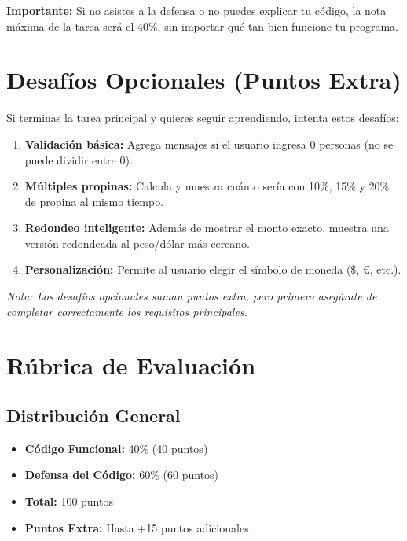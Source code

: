 \documentclass[12pt,a4paper]{article}
\begin{document}
\textbf{Importante:} Si no asistes a la defensa o no puedes explicar tu código, la nota máxima de la tarea será el 40\%, sin importar qué tan bien funcione tu programa.

\section{Desafíos Opcionales (Puntos Extra)}

Si terminas la tarea principal y quieres seguir aprendiendo, intenta estos desafíos:

\begin{enumerate}[leftmargin=*]
    \item \textbf{Validación básica:} Agrega mensajes si el usuario ingresa 0 personas (no se puede dividir entre 0).
    
    \item \textbf{Múltiples propinas:} Calcula y muestra cuánto sería con 10\%, 15\% y 20\% de propina al mismo tiempo.
    
    \item \textbf{Redondeo inteligente:} Además de mostrar el monto exacto, muestra una versión redondeada al peso/dólar más cercano.
    
    \item \textbf{Personalización:} Permite al usuario elegir el símbolo de moneda (\$, €, etc.).
\end{enumerate}

\textit{Nota: Los desafíos opcionales suman puntos extra, pero primero asegúrate de completar correctamente los requisitos principales.}

\newpage

\section{Rúbrica de Evaluación}

\subsection{Distribución General}

\begin{itemize}
    \item \textbf{Código Funcional:} 40\% (40 puntos)
    \item \textbf{Defensa del Código:} 60\% (60 puntos)
    \item \textbf{Total:} 100 puntos
    \item \textbf{Puntos Extra:} Hasta +15 puntos adicionales
\end{itemize}
\end{document}
